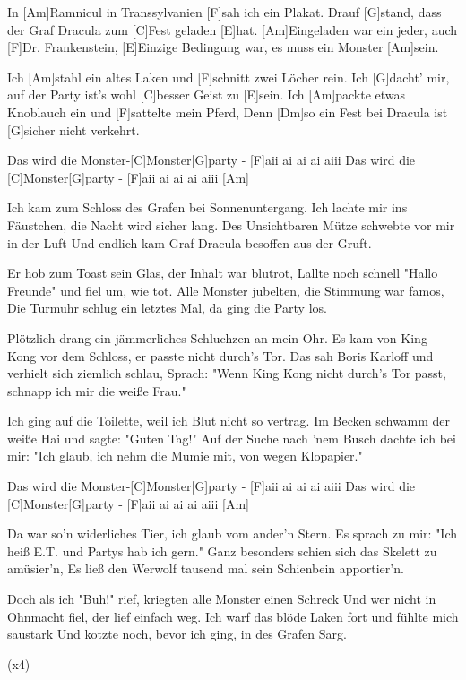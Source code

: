 

\begin{guitar}
	In [Am]Ramnicul in Transsylvanien [F]sah ich ein Plakat.
	Drauf [G]stand, dass der Graf Dracula zum [C]Fest geladen [E]hat.
	[Am]Eingeladen war ein jeder, auch [F]Dr. Frankenstein,
	[E]Einzige Bedingung war, es muss ein Monster [Am]sein.
	
	Ich [Am]stahl ein altes Laken und [F]schnitt zwei Löcher rein.
	Ich [G]dacht' mir, auf der Party ist's wohl [C]besser Geist zu [E]sein.
	Ich [Am]packte etwas Knoblauch ein und [F]sattelte mein Pferd,
	Denn [Dm]so ein Fest bei Dracula ist [G]sicher nicht verkehrt.
	
  \smallskip
	Das wird die Monster-[C]Monster[G]party - [F]aii ai ai ai aiii
	Das wird die [C]Monster[G]party - [F]aii ai ai ai aiii [Am]{}
	
	Ich kam zum Schloss des Grafen bei Sonnenuntergang.
	Ich lachte mir ins Fäustchen, die Nacht wird sicher lang.
	Des Unsichtbaren Mütze schwebte vor mir in der Luft
	Und endlich kam Graf Dracula besoffen aus der Gruft.
	
	Er hob zum Toast sein Glas, der Inhalt war blutrot,
	Lallte noch schnell "Hallo Freunde" und fiel um, wie tot.
	Alle Monster jubelten, die Stimmung war famos,
	Die Turmuhr schlug ein letztes Mal, da ging die Party los.
	
	 
	
	Plötzlich drang ein jämmerliches Schluchzen an mein Ohr.
	Es kam von King Kong vor dem Schloss, er passte nicht durch's Tor.
	Das sah Boris Karloff und verhielt sich ziemlich schlau,
	Sprach: "Wenn King Kong nicht durch's Tor passt, schnapp ich mir die weiße Frau."
	
	\pagebreak
	
	Ich ging auf die Toilette, weil ich Blut nicht so vertrag.
	Im Becken schwamm der weiße Hai und sagte: "Guten Tag!"
	Auf der Suche nach 'nem Busch dachte ich bei mir:
	"Ich glaub, ich nehm die Mumie mit, von wegen Klopapier."
	
  \smallskip
	Das wird die Monster-[C]Monster[G]party - [F]aii ai ai ai aiii
	Das wird die [C]Monster[G]party - [F]aii ai ai ai aiii [Am]{}
	
	Da war so'n widerliches Tier, ich glaub vom ander'n Stern.
	Es sprach zu mir: "Ich heiß E.T. und Partys hab ich gern."
	Ganz besonders schien sich das Skelett zu amüsier'n,
	Es ließ den Werwolf tausend mal sein Schienbein apportier'n.
	
	Doch als ich "Buh!" rief, kriegten alle Monster einen Schreck
	Und wer nicht in Ohnmacht fiel, der lief einfach weg.
	Ich warf das blöde Laken fort und fühlte mich saustark
	Und kotzte noch, bevor ich ging, in des Grafen Sarg.
	
	  (x4)
\end{guitar}
